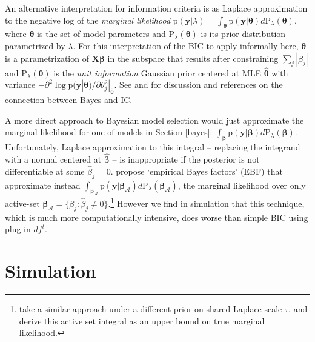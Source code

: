 \documentclass[12pt]{article}
\newcommand{\bs}[1]{\boldsymbol{#1}}
\newcommand{\mc}[1]{\mathcal{#1}}
\newcommand{\mr}[1]{\mathrm{#1}}
\newcommand{\bm}[1]{\mathbf{#1}}
\begin{document}
An alternative  interpretation for information criteria is as Laplace
approximation \citep{de_bruijn_asymptotic_1958} to the negative log of the
{\it marginal likelihood} $\mr{p}(\bm{y} | \lambda) = \int_{\bs{\theta}}
\mr{p}( \bm{y} | \bs{\theta} ) d\mr{P}_\lambda(\bs{\theta})$, where
$\bs{\theta}$ is the set of model parameters and
$\mr{P}_\lambda(\bs{\theta})$ is its prior distribution parametrized by
 $\lambda$. For this interpretation of the BIC to apply
informally here, $\bs{\theta}$ is a 
parametrization of $\bm{X}\bs{\beta}$ in the subspace that results after constraining $\sum_j |\beta_j|$  and $\mr{P}_\lambda(\bs{\theta})$ is the
{\it unit information} Gaussian prior centered at  MLE $\bs{\hat\theta}$ with
variance $-\partial^2\log\mr{p}(\bm{y}| \bs{\theta} )/\partial\theta_j^2
|_{\bs{\hat\theta}}$. See \citet{kass_bayes_1995} and
\citet{spiegelhalter_bayesian_2002} for discussion and references on the
connection between Bayes and IC.



A more direct approach to Bayesian model selection would just approximate the
marginal likelihood for one of models in Section \ref{bayes}:
$\int_{\bs{\beta}} \mr{p}( \bm{y} | \bs{\beta} ) d\mr{P}_\lambda(\bs{\beta})$.
Unfortunately, Laplace approximation to this integral -- replacing the
integrand with a normal centered at  $\bs{\hat\beta}$ --  is inappropriate if
the posterior is not differentiable at some $\hat\beta_j=0$.
\citet{zhou_path_2012} propose  `empirical Bayes factors' (EBF) that
approximate instead $\int_{\bs{\beta}_\mc{A}} \mr{p}( \bm{y} |
\bs{\beta}_\mc{A} ) d\mr{P}_\lambda(\bs{\beta}_\mc{A})$, the marginal
likelihood over only active-set $\bs{\beta}_\mc{A} = \{\beta_j: \hat\beta_j
\neq 0\}$.\footnote{\citet{yuan_efficient_2005} take a similar approach under
a different prior on shared Laplace scale $\tau$, and derive this active set
integral as an upper bound on true marginal likelihood.} However we find in
simulation that this technique, which is much more computationally intensive,
does worse than simple BIC using plug-in $df^t$.

\section{Simulation}
\label{sim}
\end{document}
